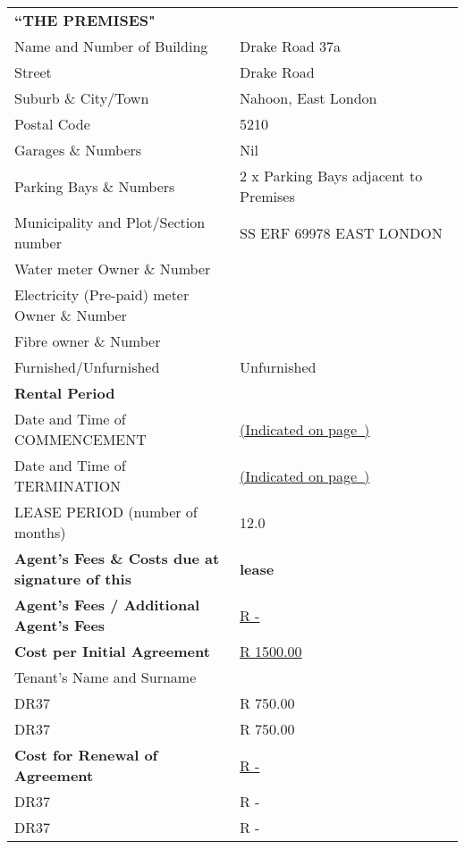 \documentclass[11pt]{article}
\begin{document}
\begin{table}[ht]
	\centering
	\begin{tabular}{p{0.5\linewidth}p{0.5\linewidth}}
		\textbf{``THE PREMISES"} & \\
		Name and Number of Building & Drake Road 37a \\
		Street & Drake Road \\
		Suburb \& City/Town & Nahoon, East London \\
		Postal Code & 5210 \\
		Garages \& Numbers & Nil \\
		Parking Bays \& Numbers & 2 x Parking Bays adjacent to Premises \\[0.3cm]

		Municipality and Plot/Section number & SS ERF 69978 EAST LONDON \\
		Water meter Owner \& Number & \\
		Electricity (Pre-paid) meter Owner \& Number & \\
		Fibre owner \& Number & \\
		Furnished/Unfurnished & Unfurnished \\[0.8cm]

		\textbf{Rental Period} & \\
		Date and Time of COMMENCEMENT & \underline{\hspace{14em}(Indicated on page~\pageref{input:commencement-date})} \\
		Date and Time of TERMINATION & \underline{\hspace{14em}(Indicated on page~\pageref{input:termination-date})} \\
		LEASE PERIOD (number of months) & 12.0 \\[0.8cm]

		\textbf{Agent's Fees \& Costs due at signature of this} \label{input:admin-preparation-fees} & \textbf{lease} \\[0.2cm]
		\textbf{Agent's Fees / Additional Agent's Fees} & \underline{R - \hspace{3em}} \\ [0.5cm]
		\textbf{Cost per Initial Agreement} & \underline{R 1500.00}\\
		\hspace{6em} Tenant's Name and Surname & \\
		DR37 \underline{\hspace{20em}} & R 750.00 \\
		DR37 \underline{\hspace{20em}} & R 750.00 \\ [0.5cm]
		\textbf{Cost for Renewal of Agreement} & \underline{R - \hspace{3em}}\\
		DR37 \underline{\hspace{20em}} & R - \\
		DR37 \underline{\hspace{20em}} & R - \\ [0.5cm]
	\end{tabular}
\end{table}
\end{document}
